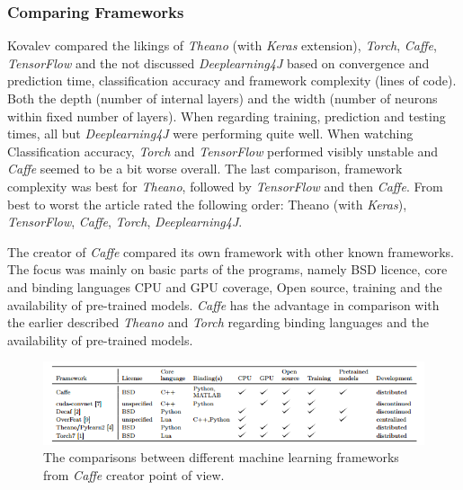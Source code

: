 \documentclass[10pt,a4paper]{report}
\begin{document}
	\subsubsection{Comparing Frameworks}
	
	Kovalev compared the likings of \textit{Theano} (with \textit{Keras} extension), \textit{Torch}, 
	\textit{Caffe}, \textit{TensorFlow} and the not discussed \textit{Deeplearning4J} based on convergence 
	and prediction time, classification accuracy and framework complexity 
	(lines of code). Both the depth (number of internal layers) and the width 
	(number of neurons within fixed number of layers). When regarding training, 
	prediction and testing times, all but \textit{Deeplearning4J} were performing quite 
	well. When watching Classification accuracy, \textit{Torch} and \textit{TensorFlow} performed 
	visibly unstable and \textit{Caffe} seemed to be a bit worse overall. The last 
	comparison, framework complexity was best for \textit{Theano}, followed by 
	\textit{TensorFlow} and then \textit{Caffe}. From best to worst the article rated the 
	following order: Theano (with \textit{Keras}), \textit{TensorFlow},\textit{ Caffe}, \textit{Torch}, 
	\textit{Deeplearning4J}.	 \cite{kovalev2016deep}
	
	The creator of\textit{ Caffe} compared its own framework with other known 
	frameworks. The focus was mainly on basic parts of the programs, namely BSD 
	licence, core and binding languages CPU and GPU coverage, Open source, 
	training and the availability of pre-trained models. \textit{Caffe} has the advantage 
	in comparison with the earlier described \textit{Theano} and \textit{Torch} regarding binding 
	languages and the availability of pre-trained 
	models. \cite{DBLP:journals/corr/JiaSDKLGGD14}
	
	\begin{figure}[h!]
		\includegraphics{CaffeMachineLearningComparisons.PNG}
		\caption{The comparisons between different machine learning frameworks 
			from \textit{Caffe} creator point of view. 
			 \cite{DBLP:journals/corr/JiaSDKLGGD14}}
		\label{fig:CaffeMachLearnComp}
	\end{figure}
	
\end{document}
